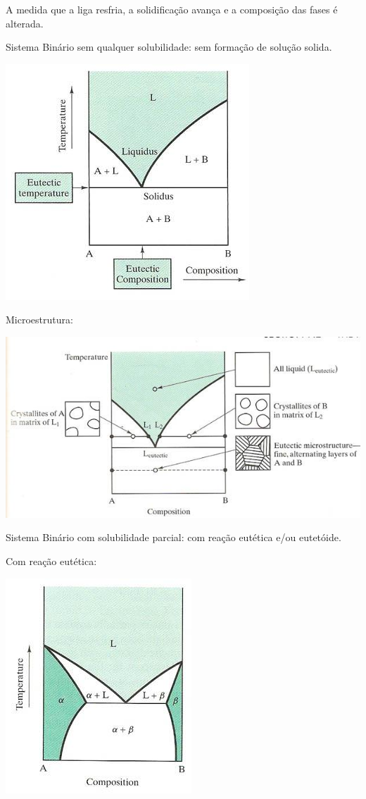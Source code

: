 A medida que a liga resfria, a solidificação avança e a composição das fases é alterada.




{\normalsize  Sistema Binário sem qualquer solubilidade: sem formação de solução solida.}

\includegraphics[scale=0.4,trim={0 0 0 0}]{figures/semQ}

Microestrutura:

\includegraphics[scale=0.4,trim={0 0 0 0}]{figures/microSemQ}


{\normalsize Sistema Binário com solubilidade parcial: com reação eutética e/ou eutetóide.}

Com reação eutética:

\includegraphics[scale=0.4,trim={0 0 0 0}]{figures/eute}

